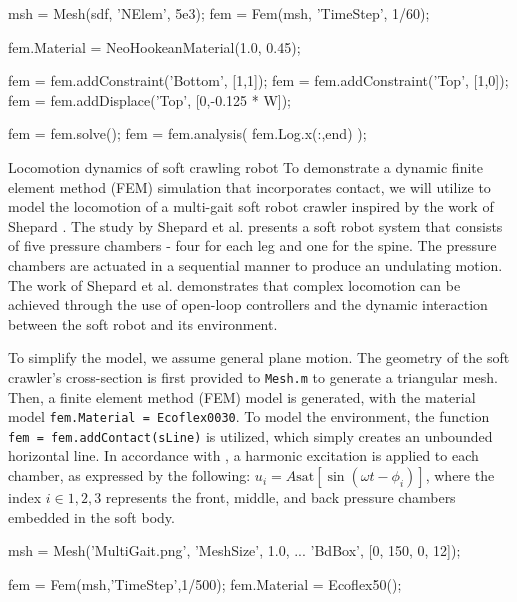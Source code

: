 \begin{matlabcode}
msh = Mesh(sdf, 'NElem', 5e3);
fem = Fem(msh, 'TimeStep', 1/60);

fem.Material = NeoHookeanMaterial(1.0, 0.45);

fem = fem.addConstraint('Bottom', [1,1]);
fem = fem.addConstraint('Top', [1,0]);
fem = fem.addDisplace('Top', [0,-0.125 * W]);

fem = fem.solve();
fem = fem.analysis( fem.Log.x(:,end) );
\end{matlabcode}
    

\begin{example}{Locomotion dynamics of soft crawling robot}
To demonstrate a dynamic finite element method (FEM) simulation that incorporates contact, we will utilize \sorotoki to model the locomotion of a multi-gait soft robot crawler inspired by the work of Shepard \cite{Shepherd2011Dec}. The study by Shepard  et al. \cite{Shepherd2011Dec} presents a soft robot system that consists of five pressure chambers - four for each leg and one for the spine. The pressure chambers are actuated in a sequential manner to produce an undulating motion. The work of Shepard  et al. \cite{Shepherd2011Dec} demonstrates that complex locomotion can be achieved through the use of open-loop controllers and the dynamic interaction between the soft robot and its environment.

To simplify the model, we assume general plane motion. The geometry of the soft crawler's cross-section is first provided to \texttt{Mesh.m} to generate a triangular mesh. Then, a finite element method (FEM) model is generated, with the material model \texttt{fem.Material = Ecoflex0030}. To model the environment, the function \texttt{fem = fem.addContact(sLine)} is utilized, which simply creates an unbounded horizontal line. In accordance with \cite{Shepherd2011Dec}, a harmonic excitation is applied to each chamber, as expressed by the following: $u_i = A\textrm{sat}\left[\sin(\omega t - \phi_i) \right]$, where the index $i \in {1,2,3}$ represents the front, middle, and back pressure chambers embedded in the soft body. 

\begin{matlabcode} 
msh = Mesh('MultiGait.png', 'MeshSize', 1.0, ...
            'BdBox', [0, 150, 0, 12]);

fem = Fem(msh,'TimeStep',1/500);
fem.Material = Ecoflex50();


\end{matlabcode}
\end{example}
